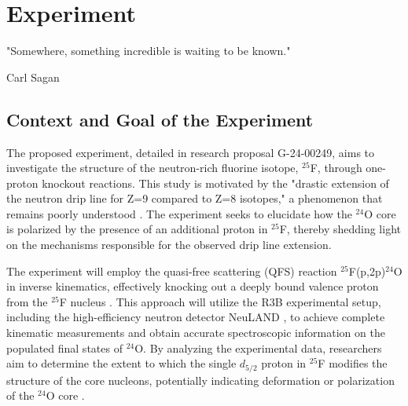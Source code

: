 
%

\makeatletter
\newcommand{\ntifpkgloaded}{%
  \@ifpackageloaded%
}
\makeatother


\chapter{Experiment}
\label{cha:experiment}

\epigraph{
	"Somewhere, something incredible is waiting to be known."
}{Carl Sagan}



\section{Context and Goal of the Experiment} %
\label{sec:contex_goal_experiment}

The proposed experiment, detailed in research proposal G-24-00249, aims to investigate the structure of the neutron-rich fluorine isotope, $^{25}$F, through one-proton knockout reactions. This study is motivated by the "drastic extension of the neutron drip line for Z=9 compared to Z=8 isotopes," a phenomenon that remains poorly understood \cite{ahn_location_2019}. The experiment seeks to elucidate how the $^{24}$O core is polarized by the presence of an additional proton in $^{25}$F, thereby shedding light on the mechanisms responsible for the observed drip line extension.

The experiment will employ the quasi-free scattering (\gls{QFS}) reaction $^{25}$F(p,2p)$^{24}$O in inverse kinematics, effectively knocking out a deeply bound valence proton from the $^{25}$F nucleus \cite{panin_exclusive_2016}. This approach will utilize the R3B experimental setup, including the high-efficiency neutron detector NeuLAND \cite{boretzky_neuland_2021}, to achieve complete kinematic measurements and obtain accurate spectroscopic information on the populated final states of $^{24}$O. By analyzing the experimental data, researchers aim to determine the extent to which the single $d_{5/2}$ proton in $^{25}$F modifies the structure of the core nucleons, potentially indicating deformation or polarization of the $^{24}$O core \cite{macchiavelli_core_2020}.

